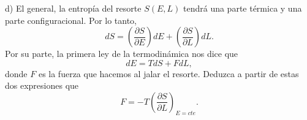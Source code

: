 d) El general, la entropía del resorte $S(E, L)$ tendrá una parte térmica y una parte configuracional. Por lo tanto,
$$
d S=\left(\frac{\partial S}{\partial E}\right) d E+\left(\frac{\partial S}{\partial L}\right) d L .
$$
Por su parte, la primera ley de la termodinámica nos dice que
$$
d E=T d S+F d L,
$$
donde $F$ es la fuerza que hacemos al jalar el resorte. Deduzca a partir de estas dos expresiones que
$$
F=-T\left(\frac{\partial S}{\partial L}\right)_{E=c t e} .
$$